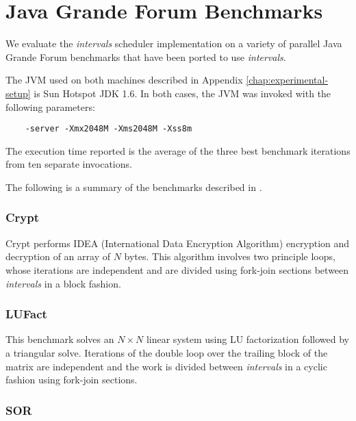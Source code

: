 
\chapter{Java Grande Forum Benchmarks}
\label{chap:appendix-benchmarks}

We evaluate the \emph{intervals} scheduler implementation on a variety
of parallel Java Grande Forum benchmarks \cite{Smith2001, Mathew1999,
  Gregg2003} that have been ported to use \emph{intervals}.

The JVM used on both machines described in Appendix
\ref{chap:experimental-setup} is Sun Hotspot JDK 1.6. In both cases,
the JVM was invoked with the following parameters:

\begin{verbatim}
    -server -Xmx2048M -Xms2048M -Xss8m
\end{verbatim}

The execution time reported is the average of the three best benchmark
iterations from ten separate invocations.

The following is a summary of the benchmarks described in
\cite{Smith2001, Mathew1999, Gregg2003}.

\subsection*{Crypt}

Crypt performs IDEA (International Data Encryption Algorithm)
encryption and decryption of an array of $N$ bytes. This algorithm
involves two principle loops, whose iterations are independent and are
divided using fork-join sections between \emph{intervals} in a block fashion.

\subsection*{LUFact}

This benchmark solves an $N \times N$ linear system using LU factorization
followed by a triangular solve. Iterations of the double loop over the
trailing block of the matrix are independent and the work is divided
between \emph{intervals} in a cyclic fashion using fork-join sections.

\subsection*{SOR}

